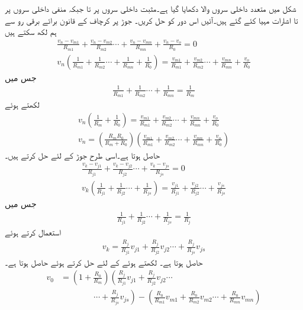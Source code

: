 شکل  میں متعدد داخلی سروں  والا  دکھایا گیا ہے۔مثبت داخلی سروں  پر  تا  جبکہ منفی داخلی سروں  پر  تا  اشارات مہیا کئے گئے ہیں۔آئیں اس دور کو حل کریں۔
جوڑ  پر کرچاف کے قانون برائے برقی رو سے ہم لکھ سکتے ہیں
\begin{align*}
\frac{v_n-v_{m1}}{R_{m1}}+\frac{v_n-v_{m2}}{R_{m2}} \cdots +\frac{v_n-v_{mn}}{R_{mn}}+\frac{v_n-v_o}{R_0}=0\\
v_n \left(\frac{1}{R_{m1}}+\frac{1}{R_{m2}}\cdots +\frac{1}{R_{mn}}+\frac{1}{R_0} \right)=\frac{v_{m1}}{R_{m1}}+\frac{v_{m2}}{R_{m2}}\cdots +\frac{v_{mn}}{R_{mn}}+\frac{v_o}{R_0}
\end{align*}
جس میں
\begin{align*}
\frac{1}{R_{m1}}+\frac{1}{R_{m2}}\cdots +\frac{1}{R_{mn}}=\frac{1}{R_m}
\end{align*}
لکھتے ہوئے
\begin{align*}
v_n \left(\frac{1}{R_m}+\frac{1}{R_0} \right)=\frac{v_{m1}}{R_{m1}}+\frac{v_{m2}}{R_{m2}}\cdots +\frac{v_{mn}}{R_{mn}}+\frac{v_o}{R_0}\\
v_n=\left(\frac{R_mR_0}{R_m+R_0} \right)\left(\frac{v_{m1}}{R_{m1}}+\frac{v_{m2}}{R_{m2}}\cdots +\frac{v_{mn}}{R_{mn}}+\frac{v_o}{R_0} \right)
\end{align*}
حاصل ہوتا ہے۔اسی طرح جوڑ  کے لئے حل کرتے ہیں۔
\begin{align*}
\frac{v_k-v_{j1}}{R_{j1}}+\frac{v_k-v_{j2}}{R_{j2}}\cdots +\frac{v_k-v_{js}}{R_{js}}=0\\
v_k \left(\frac{1}{R_{j1}}+ \frac{1}{R_{j2}}\cdots + \frac{1}{R_{js}}\right)=\frac{v_{j1}}{R_{j1}}+\frac{v_{j2}}{R_{j2}}\cdots+\frac{v_{js}}{R_{js}}
\end{align*}
جس میں
\begin{align*}
\frac{1}{R_{j1}}+ \frac{1}{R_{j2}}\cdots + \frac{1}{R_{js}}=\frac{1}{R_{j}}
\end{align*}
استعمال کرتے ہوئے 
\begin{align*}
v_k=\frac{R_j }{R_{j1}}v_{j1}+\frac{R_j }{R_{j2}}v_{j2}\cdots+\frac{R_j }{R_{js}}v_{js}
\end{align*}
حاصل ہوتا ہے۔ لکھتے ہوئے  کے لئے حل کرتے ہوئے حاصل ہوتا ہے۔
\begin{align} \label{مساوات_حسابی_جمع_و_منفی_کار}
v_0&=\left( 1+\frac{R_0}{R_m}\right)\left(\frac{R_j }{R_{j1}}v_{j1}+\frac{R_j }{R_{j2}}v_{j2}\cdots \right. \\
& \qquad  \qquad \left. \cdots +\frac{R_j }{R_{js}}v_{js} \right)-\left(\frac{R_0}{R_{m1}}v_{m1}+\frac{R_0}{R_{m2}}v_{m2}\cdots +\frac{R_0}{R_{mn}}v_{mn}\right)
\end{align}

